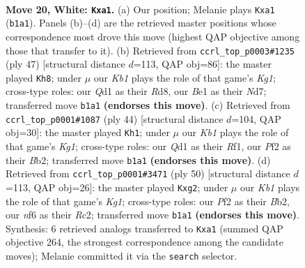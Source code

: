 \documentclass[11pt]{article}
\begin{document}
\begin{figure}[p]\centering
\begin{subfigure}{0.46\textwidth}\centering
\resizebox{\linewidth}{!}{%
\newchessgame
\chessboard[
  setfen={2b1k2r/2p1qp2/2n2n2/3p2N1/3P2Pp/1p5P/1P2PPB1/rK1QB2R w k - 0 20},
  showmover=false,
  pgfstyle=straightmove, color=movearrow, markmove={b1-a1}
]}
\caption{}
\end{subfigure}\hfill
\begin{subfigure}{0.46\textwidth}\centering
\resizebox{\linewidth}{!}{%
\newchessgame
\chessboard[
  setfen={3r2k1/p2n1ppB/2b2b1p/q2p3P/2pP4/2N1PN2/P1Q2PP1/1R4K1 b - - 5 24},
  showmover=false,
  pgfstyle=straightmove, color=movearrow, markmove={g8-h8}
]}
\caption{}
\end{subfigure}
\\[4pt]
\begin{subfigure}{0.46\textwidth}\centering
\resizebox{\linewidth}{!}{%
\newchessgame
\chessboard[
  setfen={3r2k1/ppn1p1bp/1qp3p1/3PN1n1/1P2P3/P5P1/1BQ3BP/5RK1 w - - 1 23},
  showmover=false,
  pgfstyle=straightmove, color=movearrow, markmove={g1-h1}
]}
\caption{}
\end{subfigure}\hfill
\begin{subfigure}{0.46\textwidth}\centering
\resizebox{\linewidth}{!}{%
\newchessgame
\chessboard[
  setfen={3r2k1/2q2p2/np1npp1p/8/1pPP3P/3N2P1/1BR1QPb1/6K1 w - - 0 26},
  showmover=false,
  pgfstyle=straightmove, color=movearrow, markmove={g1-g2}
]}
\caption{}
\end{subfigure}
\caption{\textbf{Move 20, White: \texttt{Kxa1}.} (a) Our position; Melanie plays \texttt{Kxa1} (\texttt{b1a1}). Panels (b)--(d) are the retrieved master positions whose correspondence most drove this move (highest QAP objective among those that transfer to it). (b) Retrieved from \texttt{ccrl\_top\_p0003\#1235} (ply 47) [structural distance $d$=113, QAP obj=86]: the master played \texttt{Kh8}; under $\mu$ our \emph{Kb1} plays the role of that game's \emph{Kg1}; cross-type roles: our \emph{Q}d1 as their \emph{R}d8, our \emph{B}e1 as their \emph{N}d7; transferred move \texttt{b1a1} \textbf{(endorses this move)}. (c) Retrieved from \texttt{ccrl\_top\_p0001\#1087} (ply 44) [structural distance $d$=104, QAP obj=30]: the master played \texttt{Kh1}; under $\mu$ our \emph{Kb1} plays the role of that game's \emph{Kg1}; cross-type roles: our \emph{Q}d1 as their \emph{R}f1, our \emph{P}f2 as their \emph{B}b2; transferred move \texttt{b1a1} \textbf{(endorses this move)}. (d) Retrieved from \texttt{ccrl\_top\_p0001\#3471} (ply 50) [structural distance $d$=113, QAP obj=26]: the master played \texttt{Kxg2}; under $\mu$ our \emph{Kb1} plays the role of that game's \emph{Kg1}; cross-type roles: our \emph{P}f2 as their \emph{B}b2, our \emph{n}f6 as their \emph{R}c2; transferred move \texttt{b1a1} \textbf{(endorses this move)}. Synthesis: 6 retrieved analogs transferred to \texttt{Kxa1} (summed QAP objective 264, the strongest correspondence among the candidate moves); Melanie committed it via the \texttt{search} selector.}
\label{fig:thought-m38}
\end{figure}
\end{document}
